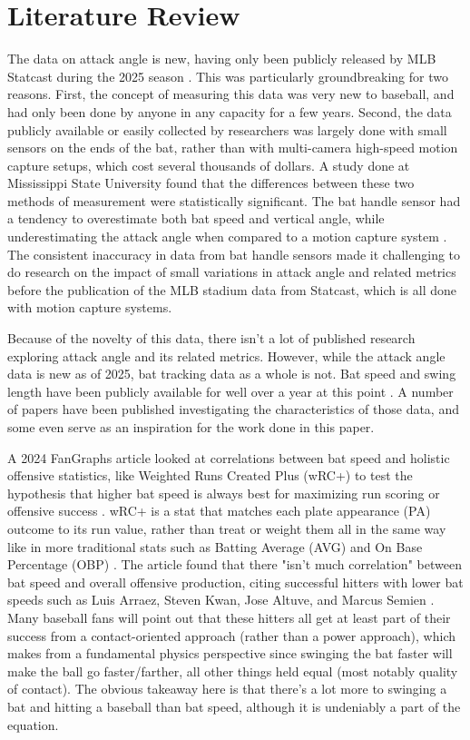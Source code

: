 \documentclass[12pt]{article}
\begin{document}
\section{Literature Review}
The data on attack angle is new, having only been publicly released by MLB Statcast during the 2025 season \parencite{petriello2025statcast}. This was particularly groundbreaking for two reasons. First, the concept of measuring this data was very new to baseball, and had only been done by anyone in any capacity for a few years. Second, the data publicly available or easily collected by researchers was largely done with small sensors on the ends of the bat, rather than with multi-camera high-speed motion capture setups, which cost several thousands of dollars. A study done at Mississippi State University found that the differences between these two methods of measurement were statistically significant. The bat handle sensor had a tendency to overestimate both bat speed and vertical angle, while underestimating the attack angle when compared to a motion capture system \parencite{stewart2021validation}. The consistent inaccuracy in data from bat handle sensors made it challenging to do research on the impact of small variations in attack angle and related metrics before the publication of the MLB stadium data from Statcast, which is all done with motion capture systems. 

Because of the novelty of this data, there isn't a lot of published research exploring attack angle and its related metrics. However, while the attack angle data is new as of 2025, bat tracking data as a whole is not. Bat speed and swing length have been publicly available for well over a year at this point \parencite{passan2024mlbstatcast}. A number of papers have been published investigating the characteristics of those data, and some even serve as an inspiration for the work done in this paper.

A 2024 FanGraphs article looked at correlations between bat speed and holistic offensive statistics, like Weighted Runs Created Plus (wRC+) to test the hypothesis that higher bat speed is always best for maximizing run scoring or offensive success \parencite{clemens2024statcastbat}. wRC+ is a stat that matches each plate appearance (PA) outcome to its run value, rather than treat or weight them all in the same way like in more traditional stats such as Batting Average (AVG) and On Base Percentage (OBP) \parencite{mlb2025wrcplus}. The article found that there "isn't much correlation" between bat speed and overall offensive production, citing successful hitters with lower bat speeds such as Luis Arraez, Steven Kwan, Jose Altuve, and Marcus Semien \parencite{clemens2024statcastbat}. Many baseball fans will point out that these hitters all get at least part of their success from a contact-oriented approach (rather than a power approach), which makes from a fundamental physics perspective since swinging the bat faster will make the ball go faster/farther, all other things held equal (most notably quality of contact). The obvious takeaway here is that there's a lot more to swinging a bat and hitting a baseball than bat speed, although it is undeniably a part of the equation.
\end{document}
